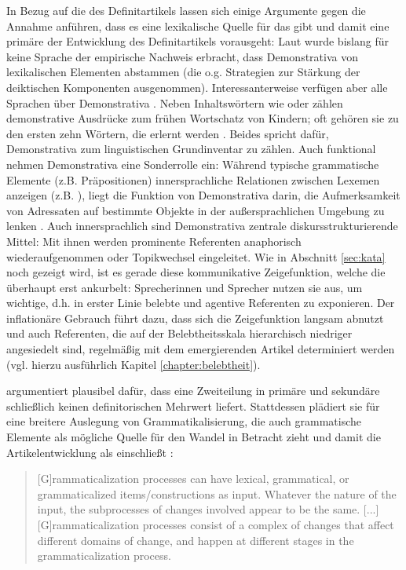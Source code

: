 In Bezug auf die  des Definitartikels  lassen sich einige Argumente gegen die Annahme anführen, dass es eine lexikalische Quelle für das  gibt und damit eine primäre  der Entwicklung des Definitartikels vorausgeht: Laut \textcite[150]{Diessel1999} wurde bislang für keine Sprache der empirische Nachweis erbracht, dass Demonstrativa  von lexikalischen Elementen abstammen (die o.g. Strategien zur Stärkung der deiktischen Komponenten ausgenommen). Interessanterweise verfügen aber alle Sprachen über Demonstrativa  \parencite[1]{Diessel1999}. Neben Inhaltswörtern wie  oder  zählen demonstrative Ausdrücke zum frühen Wortschatz von Kindern; oft gehören sie zu den ersten zehn Wörtern, die erlernt werden \parencite[476]{Diessel2006}. Beides spricht dafür, Demonstrativa  zum linguistischen Grundinventar zu zählen. Auch funktional nehmen Demonstrativa  eine Sonderrolle ein: Während typische grammatische Elemente (z.B. Präpositionen) innersprachliche Relationen zwischen Lexemen anzeigen (z.B. ), liegt die Funktion von Demonstrativa  darin, die Aufmerksamkeit von Adressaten auf bestimmte Objekte in der außersprachlichen Umgebung zu lenken \parencites{Diessel2006}. 
Auch innersprachlich sind Demonstrativa  zentrale diskursstrukturierende Mittel: Mit ihnen werden prominente Referenten anaphorisch  wiederaufgenommen oder Topikwechsel eingeleitet. Wie in Abschnitt \ref{sec:kata} noch gezeigt wird, ist es gerade diese kommunikative Zeigefunktion, welche die  überhaupt erst ankurbelt: Sprecherinnen und Sprecher nutzen sie aus, um wichtige, d.h. in erster Linie belebte und agentive Referenten  zu exponieren. Der inflationäre Gebrauch führt dazu, dass sich die Zeigefunktion langsam abnutzt und auch Referenten, die auf der Belebtheitsskala  hierarchisch niedriger angesiedelt sind, regelmäßig mit dem emergierenden Artikel  determiniert werden (vgl. hierzu ausführlich Kapitel \ref{chapter:belebtheit}).


\textcite{Breban2014} argumentiert plausibel dafür, dass eine Zweiteilung in primäre und sekundäre  schließlich keinen definitorischen Mehrwert liefert.
Stattdessen plädiert sie für eine breitere Auslegung von Grammatikalisierung, die auch grammatische Elemente als mögliche Quelle für den Wandel in Betracht zieht und damit die Artikelentwicklung als  einschließt  \parencite[zur weiterführenden Diskussion s.][]{Breban2012}: \blockcquote[498]{Breban2014}{[G]rammaticalization processes can have lexical, grammatical, or grammaticalized items/constructions as input. Whatever the nature of the input, the subprocesses of changes involved appear to be the same. [...] [G]ramma\-ticalization processes consist of a complex of changes that affect different domains of change, and happen at different stages in the grammaticalization process.}

